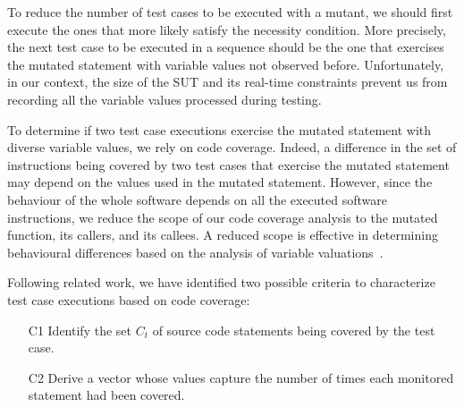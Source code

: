 To reduce the number of test cases to be executed with a mutant, 
we should first execute the ones that more likely satisfy the necessity condition. 
More precisely, the next test case to be executed in a sequence should be the one that exercises the mutated statement with variable values not observed before. 
Unfortunately, in our context, the size of the SUT and its real-time constraints prevent us from recording all the variable values processed during testing. 

To determine if two test case executions exercise the mutated statement with diverse variable values, we rely on code coverage.
Indeed, a difference in the set of instructions being covered by two test cases that exercise the mutated statement may depend on the values used in the mutated statement. 
However, since the behaviour of the whole software depends on all the executed software instructions, we reduce the scope of our code coverage analysis 
to the mutated function, its callers, and its callees.
A reduced scope is effective in determining behavioural differences based on the analysis of variable valuations~\cite{Pastore:VART:2014}.

Following related work, we have identified two possible criteria to characterize test case executions based on code coverage:
\begin{itemize}
\item[C1] Identify the set $C_t$ of source code statements being covered by the test case.
\item[C2] Derive a vector whose values capture the number of times each monitored statement had been covered.
\end{itemize}

